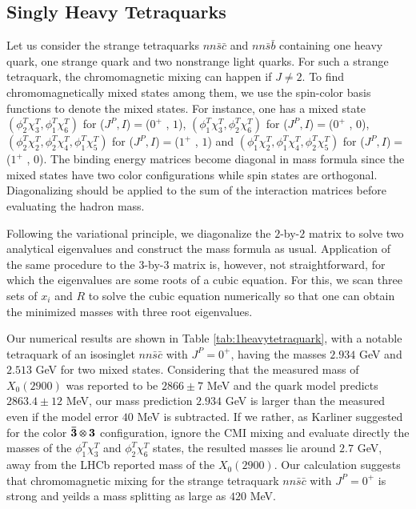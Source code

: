 \documentclass[12pt,onecolumn,floatfix,nofootinbib]{revtex4}
\begin{document}
\subsection{Singly Heavy Tetraquarks}

Let us consider the strange tetraquarks $nn\bar{s}\bar{c}$ and $nn\bar{s}%
\bar{b}$ containing one heavy quark, one strange quark and two nonstrange
light quarks. For such a strange tetraquark, the chromomagnetic mixing can
happen if $J\neq 2$. To find chromomagnetically mixed states among them, we
use the spin-color basis functions to denote the mixed states. For instance,
one has a mixed state $(\phi _{2}^{T}\chi _{3}^{T},\phi _{1}^{T}\chi
_{6}^{T})$ for ($J^{P},I$)$=$($0^{+}$ , $1$), $(\phi _{1}^{T}\chi
_{3}^{T},\phi _{2}^{T}\chi _{6}^{T})$ for ($J^{P},I$)$=$($0^{+}$ , $0$), $%
(\phi _{2}^{T}\chi _{2}^{T},\phi _{2}^{T}\chi _{4}^{T},\phi _{1}^{T}\chi
_{5}^{T})$ for ($J^{P},I$)$=$($1^{+}$ , $1$) and $(\phi _{1}^{T}\chi
_{2}^{T},\phi _{1}^{T}\chi _{4}^{T},\phi _{2}^{T}\chi _{5}^{T})$ for ($%
J^{P},I$)$=$($1^{+}$ , $0$). The binding energy matrices become diagonal in
mass formula since the mixed states have two color configurations while spin
states are orthogonal. Diagonalizing should be applied to the sum of the
interaction matrices before evaluating the hadron mass.

Following the variational principle, we diagonalize the $2$-by-$2$ matrix to
solve two analytical eigenvalues and construct the mass formula as usual.
Application of the same procedure to the 3-by-3 matrix is, however, not
straightforward, for which the eigenvalues are some roots of a cubic
equation. For this, we scan three sets of $x_{i}$ and $R$ to solve the cubic
equation numerically so that one can obtain the minimized masses with three
root eigenvalues.

Our numerical results are shown in Table \ref{tab:1heavytetraquark}, with a
notable tetraquark of an isosinglet $nn\bar{s}\bar{c}$ with $J^{P}=0^{+}$,
having the masses $2.934$ GeV and $2.513$ GeV for two mixed states.
Considering that the measured mass of $X_{0}(2900)$ was reported to be $%
2866\pm 7$ MeV \cite{LHCb:2020kd} and the quark model predicts $2863.4\pm 12$
MeV\cite{Karliner:2020vsi}, our mass prediction $2.934$ GeV is larger than
the measured even if the model error $40$ MeV is subtracted. If we rather,
as Karliner suggested for the color $\boldsymbol{\bar{3}}\otimes \boldsymbol{%
3}$ configuration, ignore the CMI mixing and evaluate directly the masses of
the $\phi _{1}^{T}\chi _{3}^{T}$ and $\phi _{2}^{T}\chi _{6}^{T}$ states,
the resulted masses lie around $2.7$ GeV, away from the LHCb reported mass
of the $X_{0}(2900)$. Our calculation suggests that chromomagnetic mixing
for the strange tetraquark $nn\bar{s}\bar{c}$ with $J^{P}=0^{+}$ is strong
and yeilds a mass splitting as large as $420$ MeV.
\end{document}
